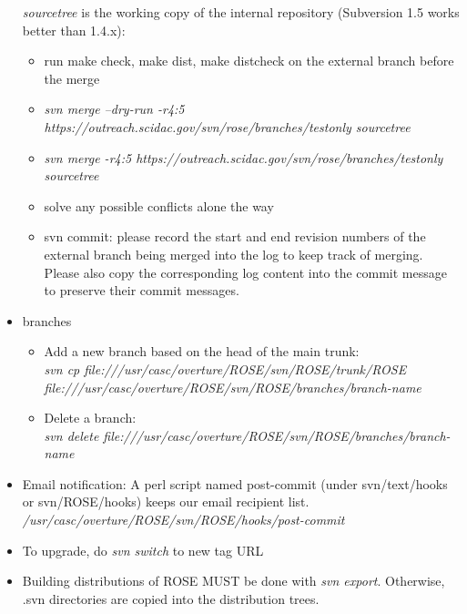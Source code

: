 \begin{itemize}
\textit{sourcetree} is the working copy of the internal repository (Subversion 1.5 works better than 1.4.x):
  \begin{itemize}
          \item run make check, make dist, make distcheck on the external branch before the merge
          \item \textit{svn merge --dry-run -r4:5
          https://outreach.scidac.gov/svn/rose/branches/testonly
          sourcetree} 
          \item \textit{svn merge -r4:5
          https://outreach.scidac.gov/svn/rose/branches/testonly
          sourcetree}
          \item solve any possible conflicts alone the way
           \item svn commit: please record the start and end revision numbers of
         the external branch being merged into the log to keep track of merging. 
         Please also copy the corresponding log content into the
         commit message to preserve their commit messages.
   \end{itemize}

\item branches   
    \begin{itemize}
    \item Add a new branch based on the head of the main trunk:\\
    \textit{svn cp file:///usr/casc/overture/ROSE/svn/ROSE/trunk/ROSE file:///usr/casc/overture/ROSE/svn/ROSE/branches/branch-name}
    \item Delete a branch: \\
    \textit{svn delete file:///usr/casc/overture/ROSE/svn/ROSE/branches/branch-name}
    \end{itemize}

\item Email notification: A perl script named post-commit (under
svn/text/hooks or svn/ROSE/hooks) keeps our email recipient list.\\
          \textit{/usr/casc/overture/ROSE/svn/ROSE/hooks/post-commit}
\item To upgrade, do \textit{svn switch} to new tag URL
\item Building distributions of ROSE MUST be done with \textit{svn export}. Otherwise, .svn directories are copied into the distribution trees. 

\end{itemize}

